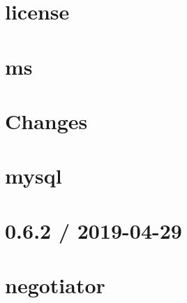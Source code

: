 \let\mypdfximage\pdfximage\def\pdfximage{\immediate\mypdfximage}\documentclass[twoside]{book}
\newcommand{\+}{\discretionary{\mbox{\scriptsize$\hookleftarrow$}}{}{}}
\begin{document}
\chapter{license}
\label{md__c_1__git_hub__p_r_o_y_e_c_t_o-_i_i_i-_g_o_t_rest-api_node_modules_ms_license}

\chapter{ms}
\label{md__c_1__git_hub__p_r_o_y_e_c_t_o-_i_i_i-_g_o_t_rest-api_node_modules_ms_readme}

\chapter{Changes}
\label{md__c_1__git_hub__p_r_o_y_e_c_t_o-_i_i_i-_g_o_t_rest-api_node_modules_mysql__changes}

\chapter{mysql}
\label{md__c_1__git_hub__p_r_o_y_e_c_t_o-_i_i_i-_g_o_t_rest-api_node_modules_mysql__readme}

\chapter{0.6.2 / 2019-\/04-\/29}
\label{md__c_1__git_hub__p_r_o_y_e_c_t_o-_i_i_i-_g_o_t_rest-api_node_modules_negotiator__h_i_s_t_o_r_y}

\chapter{negotiator}
\label{md__c_1__git_hub__p_r_o_y_e_c_t_o-_i_i_i-_g_o_t_rest-api_node_modules_negotiator__r_e_a_d_m_e}

\end{document}
